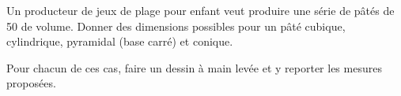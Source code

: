 
\begin{exercice}\label{exo2smath-0185}

    Un producteur de jeux de plage pour enfant veut produire une série de pâtés de \unit{50}{\centi\liter} de volume. Donner des dimensions possibles pour un pâté cubique, cylindrique, pyramidal (base carré) et conique. 

    Pour chacun de ces cas, faire un dessin à main levée et y reporter les mesures proposées.

\end{exercice}
